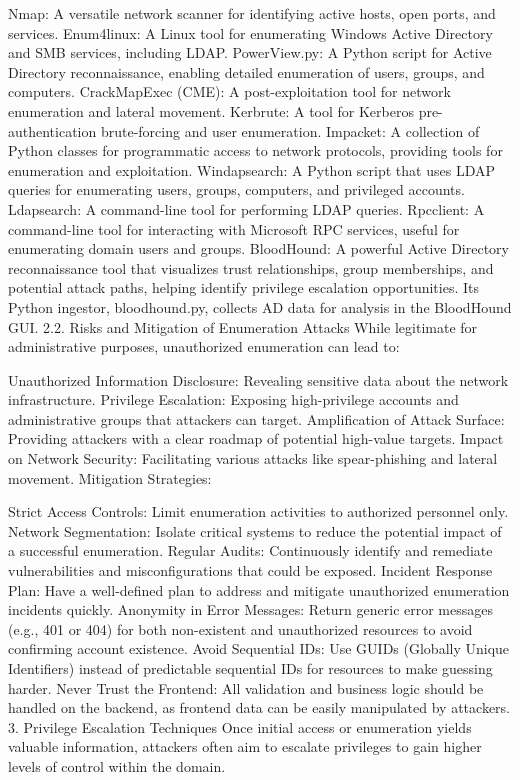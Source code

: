 Nmap: A versatile network scanner for identifying active hosts, open ports, and services.
Enum4linux: A Linux tool for enumerating Windows Active Directory and SMB services, including LDAP.
PowerView.py: A Python script for Active Directory reconnaissance, enabling detailed enumeration of users, groups, and computers.
CrackMapExec (CME): A post-exploitation tool for network enumeration and lateral movement.
Kerbrute: A tool for Kerberos pre-authentication brute-forcing and user enumeration.
Impacket: A collection of Python classes for programmatic access to network protocols, providing tools for enumeration and exploitation.
Windapsearch: A Python script that uses LDAP queries for enumerating users, groups, computers, and privileged accounts.
Ldapsearch: A command-line tool for performing LDAP queries.
Rpcclient: A command-line tool for interacting with Microsoft RPC services, useful for enumerating domain users and groups.
BloodHound: A powerful Active Directory reconnaissance tool that visualizes trust relationships, group memberships, and potential attack paths, helping identify privilege escalation opportunities. Its Python ingestor, bloodhound.py, collects AD data for analysis in the BloodHound GUI.
2.2. Risks and Mitigation of Enumeration Attacks
While legitimate for administrative purposes, unauthorized enumeration can lead to:

Unauthorized Information Disclosure: Revealing sensitive data about the network infrastructure.
Privilege Escalation: Exposing high-privilege accounts and administrative groups that attackers can target.
Amplification of Attack Surface: Providing attackers with a clear roadmap of potential high-value targets.
Impact on Network Security: Facilitating various attacks like spear-phishing and lateral movement.
Mitigation Strategies:

Strict Access Controls: Limit enumeration activities to authorized personnel only.
Network Segmentation: Isolate critical systems to reduce the potential impact of a successful enumeration.
Regular Audits: Continuously identify and remediate vulnerabilities and misconfigurations that could be exposed.
Incident Response Plan: Have a well-defined plan to address and mitigate unauthorized enumeration incidents quickly.
Anonymity in Error Messages: Return generic error messages (e.g., 401 or 404) for both non-existent and unauthorized resources to avoid confirming account existence.
Avoid Sequential IDs: Use GUIDs (Globally Unique Identifiers) instead of predictable sequential IDs for resources to make guessing harder.
Never Trust the Frontend: All validation and business logic should be handled on the backend, as frontend data can be easily manipulated by attackers.
3. Privilege Escalation Techniques
Once initial access or enumeration yields valuable information, attackers often aim to escalate privileges to gain higher levels of control within the domain.

